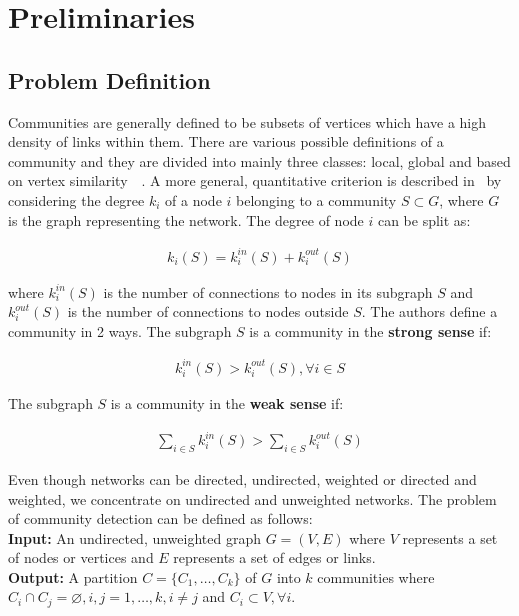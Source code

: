 \chapter{Preliminaries}
\begin{spacing}{1.5}
\thispagestyle{empty}
\section{Problem Definition}
Communities are generally defined to be subsets of vertices which have a high density of links within them. There are various possible definitions of a community and they are divided into mainly three classes: local, global and based on vertex similarity~\cite{Fortunato201075}~\cite{Wasserman-Social-1994}. A more general, quantitative criterion is described in~\cite{Radicchi02032004} by considering the degree $k_i$ of a node $i$ belonging to a community $S \subset G$, where $G$ is the graph representing the network. The degree of node $i$ can be split as:

\begin{align}
k_i(S) = k_i^{in}(S) + k_i^{out}(S)
\end{align}

where $k_i^{in}(S)$ is the number of connections to nodes in its subgraph $S$ and $k_i^{out}(S)$ is the number of connections to nodes outside $S$. The authors define a community in 2 ways. The subgraph $S$ is a community in the \textbf{strong sense} if:

\begin{align}
k_i^{in}(S) > k_i^{out}(S), \forall i \in S
\end{align}

\newpage
The subgraph $S$ is a community in the \textbf{weak sense} if:

\begin{align}
\displaystyle\sum_{i \in S} k_i^{in}(S) > \displaystyle\sum_{i \in S} k_i^{out}(S)
\end{align}

Even though networks can be directed, undirected, weighted or directed and weighted, we concentrate on undirected and unweighted networks. The problem of community detection can be defined as follows:\\

\noindent \textbf{Input: }An undirected, unweighted graph $G = (V, E)$ where $V$ represents a set of nodes or vertices and $E$ represents a set of edges or links. \\
\noindent \textbf{Output: }A partition $C = \{C_1, \ldots, C_k\}$ of $G$ into $k$ communities where $C_i \cap C_j = \varnothing, i, j = {1, \ldots, k}, i \neq j$ and $C_i \subset V,  \forall i$.


\end{spacing}
